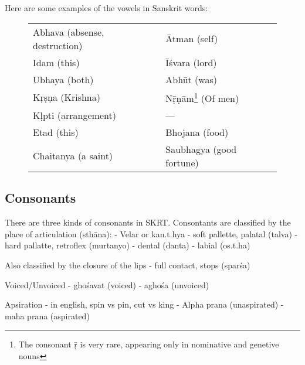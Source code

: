 Here are some examples of the vowels in Sanskrit words:

\begin{figure}[h]
\begin{center}
\begin{tabular}{@{}ll@{}}
\toprule
Abhava (absense, destruction) & Ātman (self) \\
Idam (this) & Īśvara (lord) \\
Ubhaya (both) & Abhūt (was) \\
Kṛṣṇa (Krishna) & Nṝṇām\footnote{The consonant ṝ is very rare, appearing only in nominative and genetive nouns} (Of men) \\
Kḷpti (arrangement) & --- \\
Etad (this) & Bhojana (food) \\
Chaitanya (a saint) & Saubhagya (good fortune) \\
\bottomrule
\end{tabular}
\end{center}
\end{figure}

\subsection*{Consonants}

 There are three kinds of consonants in SKRT. Consontants are classified by the place of articulation (sthāna):
 	- Velar or kan.t.hya
 	- soft pallette, palatal (talva)
 	- hard pallatte, retroflex (murtanyo)
 	- dental (danta)
 	- labial (os.t.ha)

 Also classified by the closure of the lips
 	- full contact, stops (sparśa)

 Voiced/Unvoiced
 	- ghośavat (voiced)
 	- aghośa 	(unvoiced)
 
 Apsiration
 	- in english, spin vs pin, cut vs king
 	- Alpha prana 	(unaspirated)
 	- maha prana	(aspirated)

